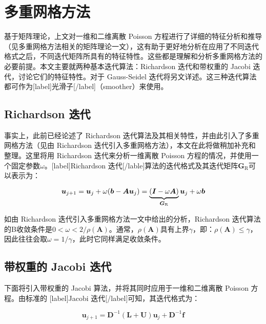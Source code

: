 \documentclass[12pt, UTF8, nofonts]{ctexart}
\begin{document}

\section*{多重网格方法}

基于矩阵理论，上文对一维和二维离散 Poisson 方程进行了详细的特征分析和推导（见多重网格方法相关的矩阵理论一文），这有助于更好地分析在应用了不同迭代格式之后，不同迭代矩阵所具有的特征特性。这些都是理解和分析多重网格方法的必要前提。本文主要就两种基本迭代算法：Richardson 迭代和带权重的 Jacobi 迭代，讨论它们的特征特性。对于 Gauss-Seidel 迭代将另文详述。这三种迭代算法都可作为[label]光滑子[/label]（smoother）来使用。

\subsection*{Richardson 迭代}

事实上，此前已经论述了 Richardson 迭代算法及其相关特性，并由此引入了多重网格方法（见由 Richardson 迭代引入多重网格方法），本文在此将做稍加补充和整理。这里将用 Richardson 迭代来分析一维离散 Poisson 方程的情况，并使用一个固定参数$\omega$。[label]Richardson 迭代[/lable]算法的迭代格式及其迭代矩阵$\boldsymbol{G}_{\mathrm{R}}$可以表示为：

\begin{equation}
  \label{eq:richardson}
    \boldsymbol{u}_{j+1} = \boldsymbol{u}_j + \omega(\boldsymbol{b}-\boldsymbol{Au}_j) = \underbrace{(\boldsymbol{I} - \omega\boldsymbol{A})}_{\boldsymbol{G}_{\mathrm{R}}}\boldsymbol{u}_j + \omega\boldsymbol{b} \\
\end{equation}

如由 Richardson 迭代引入多重网格方法一文中给出的分析，Richardson 迭代算法的B收敛条件是$0<\omega<2/\rho(\boldsymbol{A})$。通常，$\rho(\boldsymbol{A})$具有上界$\gamma$，即：$\rho(\boldsymbol{A})\leq\gamma$，因此往往会取$\omega=1/\gamma$，此时它同样满足收敛条件。

\subsection*{带权重的 Jacobi 迭代}

下面将引入带权重的 Jacobi 算法，并将其同时应用于一维和二维离散 Poisson 方程。由标准的 [label]Jacobi 迭代[/label]可知，其迭代格式为：

\begin{equation}
  \label{eq:jacobi}
  \boldsymbol{u}_{j+1} = \boldsymbol{D}^{-1} (\boldsymbol{L}+\boldsymbol{U}) \boldsymbol{u}_j + \boldsymbol{D}^{-1}\boldsymbol{f}
\end{equation}
\end{document}
